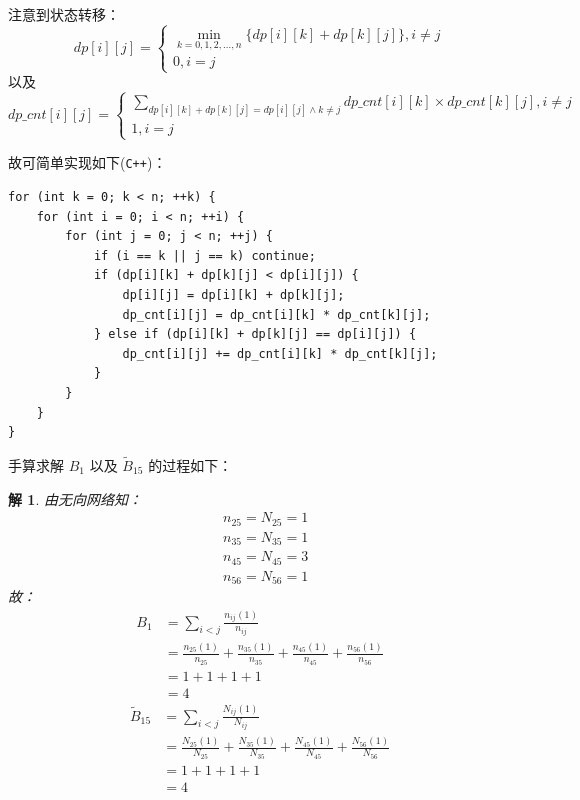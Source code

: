 \documentclass{article}
\newtheorem*{sol}{解}
\begin{document}
注意到状态转移：
$$
dp[i][j]=
\begin{cases}
    \min_{k=0,1,2,\ldots,n}\{dp[i][k]+dp[k][j]\}, i \neq j\\
    0, i=j
\end{cases}
$$
以及
$$
dp\_cnt[i][j]=
\begin{cases}
    \sum_{dp[i][k]+dp[k][j]=dp[i][j]\wedge k\neq j}dp\_cnt[i][k]\times dp\_cnt[k][j],i\neq j\\
    1,i=j
\end{cases}
$$

故可简单实现如下(\lstinline{C++})：
\begin{lstlisting}
for (int k = 0; k < n; ++k) {
    for (int i = 0; i < n; ++i) {
        for (int j = 0; j < n; ++j) {
            if (i == k || j == k) continue;
            if (dp[i][k] + dp[k][j] < dp[i][j]) {
                dp[i][j] = dp[i][k] + dp[k][j];
                dp_cnt[i][j] = dp_cnt[i][k] * dp_cnt[k][j];
            } else if (dp[i][k] + dp[k][j] == dp[i][j]) {
                dp_cnt[i][j] += dp_cnt[i][k] * dp_cnt[k][j];
            }
        }
    }
}
\end{lstlisting}

手算求解 $B_{1}$ 以及 $\tilde{B}_{15}$ 的过程如下：

\begin{sol}

由无向网络知：
\begin{align*}
    &n_{25}=N_{25}=1\\
    &n_{35}=N_{35}=1\\
    &n_{45}=N_{45}=3\\
    &n_{56}=N_{56}=1
\end{align*}
故：
\begin{align*}
    B_1&=\sum_{i< j}\frac{n_{ij}(1)}{n_{ij}}\\
    &=\frac{n_{25}(1)}{n_{25}}+\frac{n_{35}(1)}{n_{35}}+\frac{n_{45}(1)}{n_{45}}+\frac{n_{56}(1)}{n_{56}}\\
    &=1+1+1+1\\
    &=4
\end{align*}
\begin{align*}
    \tilde{B}_{15}&=\sum_{i< j}\frac{N_{ij}(1)}{N_{ij}}\\
    &=\frac{N_{25}(1)}{N_{25}}+\frac{N_{35}(1)}{N_{35}}+\frac{N_{45}(1)}{N_{45}}+\frac{N_{56}(1)}{N_{56}}\\
    &=1+1+1+1\\
    &=4
\end{align*}

\end{sol}
\end{document}
